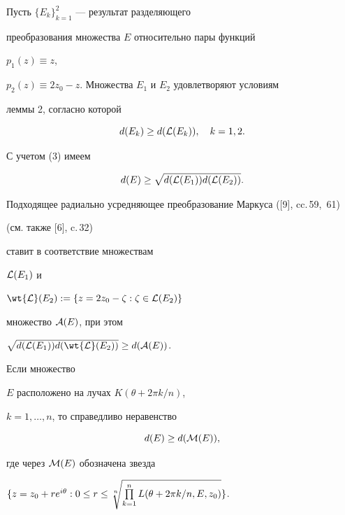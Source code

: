 \begin{pf} Пусть $\{ E_k\}^{2}_{k=1}$ --- результат разделяющего


преобразования множества $E$ относительно пары функций 


$p_1(z)\equiv z$,


$p_2(z)\equiv 2z_0-z$. Множества $E_1$ и $E_2$ удовлетворяют условиям


леммы 2, согласно которой


$$


d(E_k)\geq d({\cal L}(E_k)),\quad k=1,2.


$$


С учетом (3) имеем 


$$


d(E)\geq \sqrt{d({\cal L}(E_1))d({\cal L}(E_2))}.


$$


Подходящее радиально усредняющее преобразование Маркуса ([9], cc.\,59,~61)


(см. также [6], c.\,32)


ставит в соответствие множествам 


${\cal L} (E_1)$ и


$\wt{\cal L} (E_2):=\{ z=2z_0-\zeta : \zeta \in {\cal L} (E_2)\}$ 


множество ${\cal A} (E)$, при этом  


$\sqrt{d({\cal L}(E_1))d(\wt{\cal L}(E_2))}\geq d({\cal A} (E))$.


\end{pf}





\begin{thm} Если множество


$E$ расположено на лучах $K(\theta+2\pi k/n)$,


$k=1,\dotsc,n$, то справедливо неравенство 


$$


d(E)\geq d({\cal M}(E)),


$$


где через ${\cal M}(E)$ обозначена звезда 


$\{z=z_0+re^{i\theta}:


0\leq r\leq\sqrt[\uproot{2}n]{\prod\limits^n_{k=1}


L(\theta+2\pi k/n, E,z_0)}\} $.


\end{thm}





